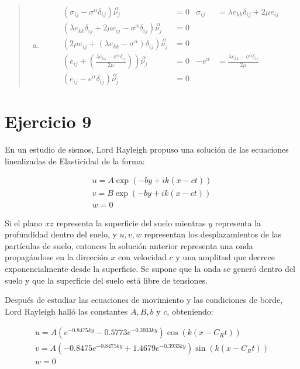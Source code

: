 \documentclass[a4paper,10pt,twoside,final,spanish]{article}
\begin{document}
\begin{quote}
\begin{enumerate}[a.]
\item 

\begin{align*}
(\sigma_{ij}-\sigma^{\alpha}\delta_{ij})\stackrel{\alpha}{\nu_{j}} &= 0
&
\sigma_{ij} &= \lambda e_{kk}\delta_{ij}+2\mu e_{ij} \\
(\lambda e_{kk}\delta_{ij}
+2\mu e_{ij}
-\sigma^{\alpha}\delta_{ij})
\stackrel{\alpha}{\nu_{j}} &= 0 & \\
(2\mu e_{ij}
+(\lambda e_{kk}-\sigma^{\alpha})\delta_{ij})
\stackrel{\alpha}{\nu_{j}} &= 0 & \\
\left(e_{ij}
+\left(\frac{\lambda e_{kk}-\sigma^{\alpha}\delta_{ij}}{2\mu}\right)\right)
\stackrel{\alpha}{\nu_{j}} &= 0 
& -e^{\alpha}
&=\frac{\lambda e_{kk}-\sigma^{\alpha}\delta_{ij}}{2\mu} \\
(e_{ij}-e^{\alpha}\delta_{ij})\stackrel{\alpha}{\nu_{j}} &= 0 & 
\end{align*}

\end{enumerate}
\end{quote}

\section*{Ejercicio 9}

En un estudio de sismos, Lord Rayleigh propuso una solución de las ecuaciones linealizadas de Elasticidad de la forma:

\[
\begin{array}{l}
u=A\exp(-by+ik(x-ct)) \\
v=B\exp(-by+ik(x-ct)) \\
w=0
\end{array}
\]

Si el plano $xz$ representa la superficie del suelo mientras $y$ representa la profundidad dentro del suelo, y $u,v,w$ representan los desplazamientos de las partículas de suelo, entonces la solución anterior representa una onda propagándose en la dirección $x$ con velocidad $c$ y una amplitud que decrece exponencialmente desde la superficie. Se supone que la onda se generó dentro del suelo y que la superficie del suelo está libre de tensiones.

Después de estudiar las ecuaciones de movimiento y las condiciones de borde, Lord 
Rayleigh halló las constantes $A,B,b$ y $c$, obteniendo:

\[
\begin{array}{l}
u=A(e^{-0.8475ky}-0.5773e^{-0.3933ky})\cos(k(x-C_{R}t))        \\
v=A(-0.8475e^{-0.8475ky}+1.4679e^{-0.3933ky})\sin(k(x-C_{R}t)) \\
w=0
\end{array}
\]
 
\end{document}
